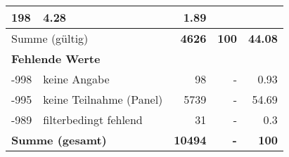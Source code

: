 \begin{longtable}{lXrrr}
       \num{198} &
       \num[round-mode=places,round-precision=2]{4.28} &
         \num[round-mode=places,round-precision=2]{1.89} \\
     \midrule
     \multicolumn{2}{l}{Summe (gültig)} &
       \textbf{\num{4626}} &
     \textbf{\num{100}} &
       \textbf{\num[round-mode=places,round-precision=2]{44.08}} \\
     \multicolumn{5}{l}{\textbf{Fehlende Werte}}\\
       -998 &
       keine Angabe &
         \num{98} &
        - &
         \num[round-mode=places,round-precision=2]{0.93} \\
       -995 &
       keine Teilnahme (Panel) &
         \num{5739} &
        - &
         \num[round-mode=places,round-precision=2]{54.69} \\
       -989 &
       filterbedingt fehlend &
         \num{31} &
        - &
         \num[round-mode=places,round-precision=2]{0.3} \\
     \midrule
     \multicolumn{2}{l}{\textbf{Summe (gesamt)}} &
          \textbf{\num{10494}} &
        \textbf{-} &
        \textbf{\num{100}} \\
     \bottomrule
     \end{longtable}
     

